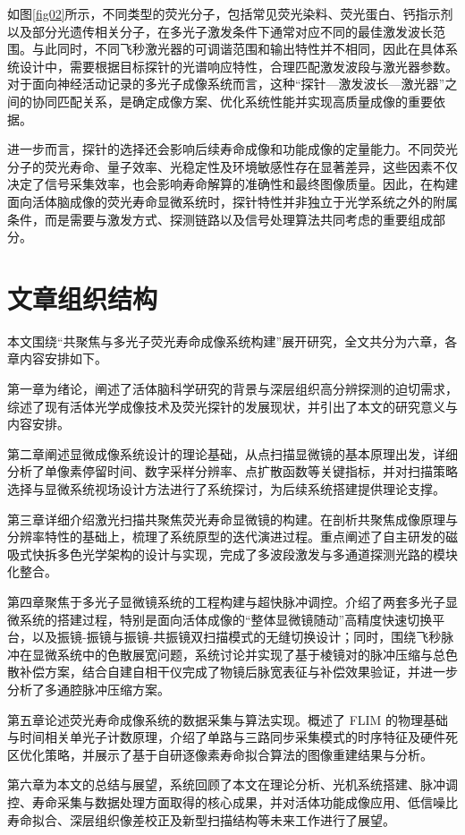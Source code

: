 如图\ref{fig02}所示，不同类型的荧光分子，包括常见荧光染料、荧光蛋白、钙指示剂以及部分光遗传相关分子，在多光子激发条件下通常对应不同的最佳激发波长范围。与此同时，不同飞秒激光器的可调谐范围和输出特性并不相同，因此在具体系统设计中，需要根据目标探针的光谱响应特性，合理匹配激发波段与激光器参数。对于面向神经活动记录的多光子成像系统而言，这种``探针—激发波长—激光器''之间的协同匹配关系，是确定成像方案、优化系统性能并实现高质量成像的重要依据。

进一步而言，探针的选择还会影响后续寿命成像和功能成像的定量能力。不同荧光分子的荧光寿命、量子效率、光稳定性及环境敏感性存在显著差异，这些因素不仅决定了信号采集效率，也会影响寿命解算的准确性和最终图像质量。因此，在构建面向活体脑成像的荧光寿命显微系统时，探针特性并非独立于光学系统之外的附属条件，而是需要与激发方式、探测链路以及信号处理算法共同考虑的重要组成部分。


\section{文章组织结构}\label{1.3}
本文围绕``共聚焦与多光子荧光寿命成像系统构建''展开研究，全文共分为六章，各章内容安排如下。

第一章为绪论，阐述了活体脑科学研究的背景与深层组织高分辨探测的迫切需求，综述了现有活体光学成像技术及荧光探针的发展现状，并引出了本文的研究意义与内容安排。

第二章阐述显微成像系统设计的理论基础，从点扫描显微镜的基本原理出发，详细分析了单像素停留时间、数字采样分辨率、点扩散函数等关键指标，并对扫描策略选择与显微系统视场设计方法进行了系统探讨，为后续系统搭建提供理论支撑。

第三章详细介绍激光扫描共聚焦荧光寿命显微镜的构建。在剖析共聚焦成像原理与分辨率特性的基础上，梳理了系统原型的迭代演进过程。重点阐述了自主研发的磁吸式快拆多色光学架构的设计与实现，完成了多波段激发与多通道探测光路的模块化整合。

第四章聚焦于多光子显微镜系统的工程构建与超快脉冲调控。介绍了两套多光子显微系统的搭建过程，特别是面向活体成像的``整体显微镜随动''高精度快速切换平台，以及振镜-振镜与振镜-共振镜双扫描模式的无缝切换设计；同时，围绕飞秒脉冲在显微系统中的色散展宽问题，系统讨论并实现了基于棱镜对的脉冲压缩与总色散补偿方案，结合自建自相干仪完成了物镜后脉宽表征与补偿效果验证，并进一步分析了多通腔脉冲压缩方案。

第五章论述荧光寿命成像系统的数据采集与算法实现。概述了 FLIM 的物理基础与时间相关单光子计数原理，介绍了单路与三路同步采集模式的时序特征及硬件死区优化策略，并展示了基于自研逐像素寿命拟合算法的图像重建结果与分析。

第六章为本文的总结与展望，系统回顾了本文在理论分析、光机系统搭建、脉冲调控、寿命采集与数据处理方面取得的核心成果，并对活体功能成像应用、低信噪比寿命拟合、深层组织像差校正及新型扫描结构等未来工作进行了展望。